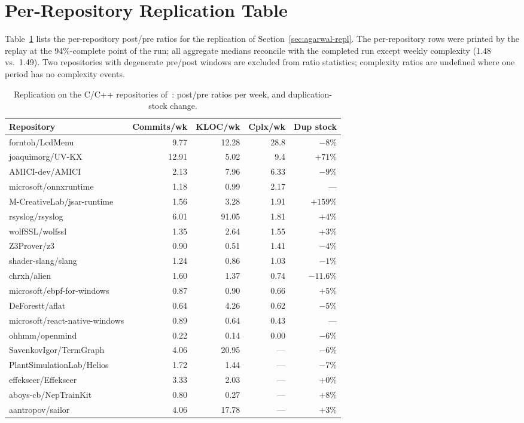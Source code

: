 \documentclass[sigplan,11pt,nonacm=true]{acmart}
\begin{document}



\appendix

\section{Per-Repository Replication Table}
\label{app:agarwal}

Table~\ref{tab:agarwal} lists the per-repository post/pre ratios for the
replication of Section~\ref{sec:agarwal-repl}. The per-repository rows were
printed by the replay at the 94\%-complete point of the run; all aggregate
medians reconcile with the completed run except weekly complexity (1.48
vs.\ 1.49). Two repositories with degenerate pre/post windows are excluded
from ratio statistics; complexity ratios are undefined where one period has no
complexity events.

\begin{table}[h]
\caption{Replication on the C/C++ repositories of~\cite{agarwal2026}:
post/pre ratios per week, and duplication-stock change.}
\label{tab:agarwal}
\small
\begin{tabular}{@{}lrrrr@{}}
\toprule
Repository & Commits/wk & KLOC/wk & Cplx/wk & Dup stock \\
\midrule
forntoh/LcdMenu            & 9.77  & 12.28 & 28.8 & $-8\%$ \\
joaquimorg/UV-KX           & 12.91 & 5.02  & 9.4  & $+71\%$ \\
AMICI-dev/AMICI            & 2.13  & 7.96  & 6.33 & $-9\%$ \\
microsoft/onnxruntime      & 1.18  & 0.99  & 2.17 & --- \\
M-CreativeLab/jsar-runtime & 1.56  & 3.28  & 1.91 & $+159\%$ \\
rsyslog/rsyslog            & 6.01  & 91.05 & 1.81 & $+4\%$ \\
wolfSSL/wolfssl            & 1.35  & 2.64  & 1.55 & $+3\%$ \\
Z3Prover/z3                & 0.90  & 0.51  & 1.41 & $-4\%$ \\
shader-slang/slang         & 1.24  & 0.86  & 1.03 & $-1\%$ \\
chrxh/alien                & 1.60  & 1.37  & 0.74 & $-11.6\%$ \\
microsoft/ebpf-for-windows & 0.87  & 0.90  & 0.66 & $+5\%$ \\
DeForestt/aflat            & 0.64  & 4.26  & 0.62 & $-5\%$ \\
microsoft/react-native-windows & 0.89 & 0.64 & 0.43 & --- \\
ohhmm/openmind             & 0.22  & 0.14  & 0.00 & $-6\%$ \\
SavenkovIgor/TermGraph     & 4.06  & 20.95 & ---  & $-6\%$ \\
PlantSimulationLab/Helios  & 1.72  & 1.44  & ---  & $-7\%$ \\
effekseer/Effekseer        & 3.33  & 2.03  & ---  & $+0\%$ \\
aboys-cb/NepTrainKit       & 0.80  & 0.27  & ---  & $+8\%$ \\
aantropov/sailor           & 4.06  & 17.78 & ---  & $+3\%$ \\
\bottomrule
\end{tabular}
\end{table}
\end{document}
